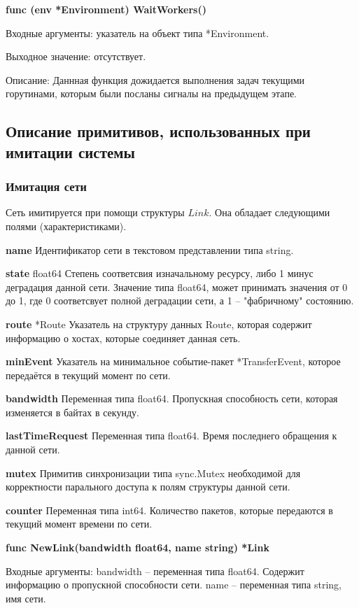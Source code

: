 \textbf{func (env *Environment) WaitWorkers() }

Входные аргументы: указатель на объект типа *Environment.

Выходное значение: отсутствует. 

Описание: Даннная функция дожидается выполнения задач текущими горутинами, которым были посланы сигналы на предыдущем этапе.



\subsection{Описание примитивов, использованных при имитации системы}

\subsubsection{Имитация сети}

Сеть имитируется при помощи структуры $Link$. Она обладает следующими полями (характеристиками). 

\textbf{name}
Идентификатор сети в текстовом представлении типа string. 

\textbf{state}	 float64
Степень соответсвия изначальному ресурсу, либо 1 минус деградация данной сети. Значение типа float64, может принимать значения от 0 до 1, где 0 соответсвует полной деградации сети, а 1 -- "фабричному" состоянию. 

\textbf{route}	 *Route
Указатель на структуру данных Route, которая содержит информацию о хостах, которые соединяет данная сеть. 

\textbf{minEvent}	
Указатель на минимальное событие-пакет *TransferEvent, которое передаётся в текущий момент по сети. 

\textbf{bandwidth}	 
Переменная типа float64. Пропускная способность сети, которая изменяется в байтах в секунду. 

\textbf{lastTimeRequest}
Переменная типа float64. Время последнего обращения к данной сети.

\textbf{mutex}	           
Примитив синхронизации типа sync.Mutex необходимой для корректности парального доступа к полям структуры данной сети.
 
\textbf{counter}
Переменная типа int64. Количество пакетов, которые передаются в текущий момент времени по сети. 


\textbf{func NewLink(bandwidth float64, name string) *Link}

Входные аргументы: bandwidth -- переменная типа float64. Содержит информацию о пропускной способности сети. name -- переменная типа string, имя сети. 

